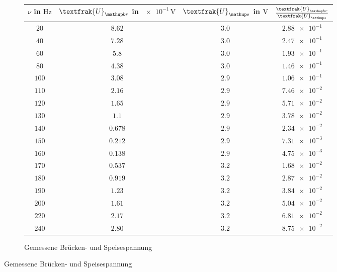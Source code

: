 \begin{figure}
\caption{Messwerte und Teilergebnisse der Wien-Robinson-Brücke}
    \label{tab:mes_teil_wien}
\begin{subfigure}{0.49\textwidth}
\centering
\caption{Gemessene Brücken- und Speisespannung}
  \label{tab:U_br_u-s}
\begin{tabular}{S S S S}
    \toprule
    {$\nu$  in $\si{\hertz}$} &  {$\textfrak{U}\ua{br}$ in $\num{e-1}\,\si{\volt}$} & {$\textfrak{U}\ua{s}$  in $\si{\volt}$} & {$\frac{\textfrak{U}\ua{br}}{\textfrak{U}\ua{s}}$} \\
    \midrule
     {$\num{20}$} & {$\num{8.62}$} &  {$\num{3.0}$}& {$\num{2.88e-1}$}  \\
     {$\num{40}$} & {$\num{7.28}$}  & {$\num{3.0}$} & {$\num{2.47e-1}$} \\
     {$\num{60}$} & {$\num{5.8}$}  & {$\num{3.0}$} & {$\num{1.93e-1}$}  \\
     {$\num{80}$} & {$\num{4.38}$}  & {$\num{3.0}$} & {$\num{1.46e-1}$}  \\
     {$\num{100}$} & {$\num{3.08}$}  & {$\num{2.9}$} & {$\num{1.06e-1}$}  \\
     {$\num{110}$} & {$\num{2.16}$}  & {$\num{2.9}$} & {$\num{7.46e-2}$}  \\
     {$\num{120}$} & {$\num{1.65}$}  & {$\num{2.9}$} & {$\num{5.71e-2}$}  \\
     {$\num{130}$} & {$\num{1.1}$}  & {$\num{2.9}$} & {$\num{3.78e-2}$}  \\
     {$\num{140}$} & {$\num{0.678}$}  & {$\num{2.9}$} & {$\num{2.34e-2}$}  \\
     {$\num{150}$} & {$\num{0.212}$}  & {$\num{2.9}$} & {$\num{7.31e-3}$}  \\
     {$\num{160}$} & {$\num{0.138}$}  & {$\num{2.9}$} & {$\num{4.75e-3}$}  \\
     {$\num{170}$} & {$\num{0.537}$}  & {$\num{3.2}$} & {$\num{1.68e-2}$}  \\
     {$\num{180}$} & {$\num{0.919}$}  & {$\num{3.2}$} & {$\num{2.87e-2}$}  \\
     {$\num{190}$} & {$\num{1.23}$}  & {$\num{3.2}$} & {$\num{3.84e-2}$}  \\
     {$\num{200}$} & {$\num{1.61}$}  & {$\num{3.2}$} & {$\num{5.04e-2}$}  \\
     {$\num{220}$} & {$\num{2.17}$}  & {$\num{3.2}$} & {$\num{6.81e-2}$}  \\
     {$\num{240}$} & {$\num{2.80}$}  & {$\num{3.2}$} & {$\num{8.75e-2}$}  \\

\end{tabular}
\end{subfigure}
\end{figure}
